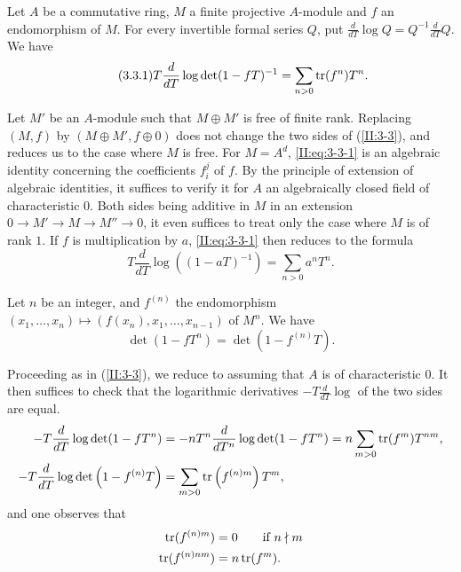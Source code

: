 \begin{proposition_}\label{II:3-3}
Let $A$ be a commutative ring, $M$ a finite projective $A$-module and
$f$ an endomorphism of $M$. For every invertible formal series $Q$, put
$\frac{d}{dT}\log Q = Q^{-1}\frac{d}{dT}Q$. We have
\begin{equation*}\tag{3.3.1}\label{II:eq:3-3-1}
  T\frac{d}{dT}\log\det(1-f T)^{-1} = \sum_{n>0} \operatorname{tr}(f^n) T^n \text{.}
\end{equation*}
\end{proposition_}

Let $M'$ be an $A$-module such that $M\oplus M'$ is free of finite rank.
Replacing $(M,f)$ by $(M\oplus M',f\oplus 0)$ does not change the two sides
of (\ref{II:3-3}), and reduces us to the case where $M$ is free. For $M=A^d$,
\eqref{II:eq:3-3-1} is an algebraic identity concerning the coefficients
$f_i^j$ of $f$. By the principle of extension of algebraic identities,
it suffices to verify it for $A$ an algebraically closed field of
characteristic $0$. Both sides being additive in $M$ in an
extension $0\to M'\to M\to M''\to 0$, it even suffices to treat only the case
where $M$ is of rank $1$. If $f$ is multiplication by $a$,
\eqref{II:eq:3-3-1} then reduces to the formula
\[
  T\frac{d}{dT}\log\left((1-a T)^{-1}\right) = \sum_{n>0} a^n T^n \text{.}
\]




\begin{corollary_}\label{II:3-4}
Let $n$ be an integer, and $f^{(n)}$ the endomorphism
$(x_1,\dotsc,x_n)\mapsto \left(f(x_n),x_1,\dotsc,x_{n-1}\right)$ of $M^n$.
We have
\begin{equation*}\tag{3.4.1}\label{II:eq:3-4-1}
  \det(1-f T^n) = \det(1-f^{(n)} T) \text{.}
\end{equation*}
\end{corollary_}

Proceeding as in (\ref{II:3-3}), we reduce to assuming that $A$ is of
characteristic $0$. It then suffices to check that the logarithmic
derivatives $-T\frac{d}{dT}\log$ of the two sides are equal.
\begin{align*}
  -T\frac{d}{dT}\log\det(1-f T^n) &= - n T^n \frac{d}{dT^n} \log\det(1-f T^n) = n \sum_{m>0} \operatorname{tr}(f^m) T^{n m} \text{,} \\
  -T \frac{d}{dT}\log\det\left(1-f^{(n)} T\right) &= \sum_{m>0} \operatorname{tr}\left(f^{(n) m}\right) T^m \text{,}
\end{align*}
and one observes that
\begin{align*}
  \operatorname{tr}(f^{(n) m}) &= 0 \qquad \text{if $n\nmid m$} \\
  \operatorname{tr}(f^{(n) n m}) &= n \operatorname{tr}(f^m) \text{.}
\end{align*}




